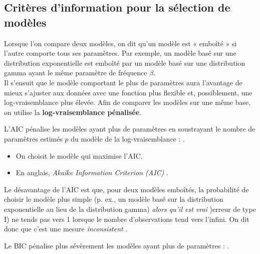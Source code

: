 \documentclass[10pt, french]{article}
\begin{document}
\begin{multicols*}{2}
\subsection{Critères d'information pour la sélection de modèles}
Lorsque l'on compare deux modèles, on dit qu'un modèle est « emboîté » si l'autre comporte tous ses paramètres. Par exemple, un modèle basé sur une distribution exponentielle est emboîté par un modèle basé sur une distribution gamma ayant le même paramètre de fréquence $\beta$. \\

Il s'ensuit que le modèle comportant le plus de paramètres aura l'avantage de mieux s'ajuster aux données avec une fonction plus flexible et, possiblement, une log-vraisemblance plus élevée. Afin de comparer les modèles sur une même base, on utilise la \textbf{log-vraisemblance pénalisée}.

\begin{definitionNOHFILLsub}
L'AIC pénalise les modèles ayant plus de paramètres en soustrayant le nombre de paramètres estimés $p$ du modèle de la log-vraisemblance : .

\begin{itemize}
	\item	On choisit le modèle qui maximise l'AIC.
	\item	En anglais, \og \textit{Akaike Information Criterion (AIC)} \fg{}.
\end{itemize}
\end{definitionNOHFILLsub}


Le désavantage de l'AIC est que, pour deux modèles emboîtés, la probabilité de choisir le modèle plus simple (p. ex., un modèle basé sur la distribution exponentielle au lieu de la distribution gamma) \textit{alors qu'il est vrai} )erreur de type I) ne tends pas vers 1 lorsque le nombre d'observations tend vers l'infini. On dit donc que c'est une mesure \og \textit{inconsistent} \fg{}. 

\begin{definitionNOHFILLsub}
Le BIC pénalise plus sévèrement les modèles ayant plus de paramètres : .


\end{definitionNOHFILLsub}
\end{multicols*}
\end{document}
